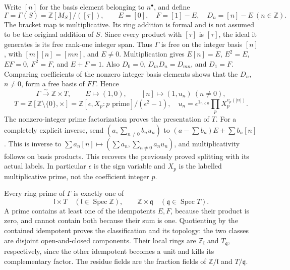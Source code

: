 \documentclass[
  10pt,
]{article}
\begin{document}
Write \([n]\) for the basis element belonging to \(n^\bullet\), and
define \[
\Gamma=\Gamma(S)=\mathbb Z[M_S]/([\tau]),\qquad
E=[0],\quad F=[1]-E,\quad D_n=[n]-E\ (n\in\mathbb Z).
\tag{TPS35}
\] The bracket map is multiplicative. Its ring addition is formal and is
not assumed to be the original addition of \(S\). Since every product
with \([\tau]\) is \([\tau]\), the ideal it generates is its free
rank-one integer span. Thus \(\Gamma\) is free on the integer basis
\([n]\), with \([m][n]=[mn]\), and \(E\ne0\). Multiplication gives
\(E[n]=E\), \(E^2=E\), \(EF=0\), \(F^2=F\), and \(E+F=1\). Also
\(D_0=0\), \(D_mD_n=D_{mn}\), and \(D_1=F\). Comparing coefficients of
the nonzero integer basis elements shows that the \(D_n\), \(n\ne0\),
form a free basis of \(F\Gamma\). Hence \[
\boxed{\Gamma\xrightarrow{\sim}\mathbb Z\times T,\qquad
E\mapsto(1,0),\qquad [n]\mapsto(1,u_n)\ (n\ne0),}
\] \[
T=\mathbb Z[\mathbb Z\setminus\{0\},\times]
=\mathbb Z[\epsilon,X_p:p\text{ prime}]/(\epsilon^2-1),
\quad u_n=\epsilon^{1_{n<0}}\prod_pX_p^{v_p(|n|)}.
\tag{TPS36}
\] The nonzero-integer prime factorization proves the presentation of
\(T\). For a completely explicit inverse, send
\((a,\sum_{n\ne0}b_nu_n)\) to \((a-\sum b_n)E+\sum b_n[n]\). This is
inverse to \(\sum a_n[n]\mapsto(\sum a_n,\sum_{n\ne0}a_nu_n)\), and
multiplicativity follows on basis products. This recovers the previously
proved splitting with its actual labels. In particular \(\epsilon\) is
the sign variable and \(X_p\) is the labelled multiplicative prime, not
the coefficient integer \(p\).

Every ring prime of \(\Gamma\) is exactly one of \[
\mathfrak l\times T\quad(\mathfrak l\in\operatorname{Spec}\mathbb Z),
\qquad
\mathbb Z\times\mathfrak q\quad(\mathfrak q\in\operatorname{Spec}T).
\tag{TPS37}
\] A prime contains at least one of the idempotents \(E,F\), because
their product is zero, and cannot contain both because their sum is one.
Quotienting by the contained idempotent proves the classification and
its topology: the two classes are disjoint open-and-closed components.
Their local rings are \(\mathbb Z_{\mathfrak l}\) and
\(T_{\mathfrak q}\), respectively, since the other idempotent becomes a
unit and kills its complementary factor. The residue fields are the
fraction fields of \(\mathbb Z/\mathfrak l\) and \(T/\mathfrak q\).
\end{document}
